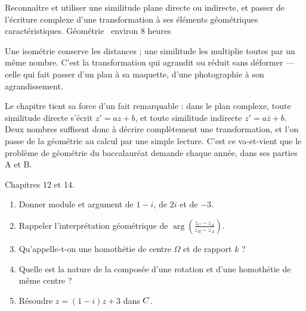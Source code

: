   {Reconnaître et utiliser une similitude plane directe ou indirecte, et
   passer de l'écriture complexe d'une transformation à ses éléments
   géométriques caractéristiques.}
  {Géométrie \textbullet\ environ 8 heures}

Une isométrie conserve les distances ; une similitude les multiplie toutes par
un même nombre. C'est la transformation qui agrandit ou réduit sans déformer
— celle qui fait passer d'un plan à sa maquette, d'une photographie à son
agrandissement.

Le chapitre tient sa force d'un fait remarquable : dans le plan complexe,
toute similitude directe s'écrit $z' = az+b$, et toute similitude indirecte
$z' = a\overline z+b$. Deux nombres suffisent donc à décrire complètement une
transformation, et l'on passe de la géométrie au calcul par une simple
lecture. C'est ce va-et-vient que le problème de géométrie du baccalauréat
demande chaque année, dans ses parties A et B.

\begin{revision}
Chapitres 12 et 14.

\begin{enumerate}[label=\textbf{\arabic*.}, leftmargin=*, itemsep=0.35em]
  \item Donner module et argument de $1-i$, de $2i$ et de $-3$.
  \item Rappeler l'interprétation géométrique de
        $\arg\!\left(\frac{z_{C}-z_{A}}{z_{B}-z_{A}}\right)$.
  \item Qu'appelle-t-on une homothétie de centre $\Omega$ et de rapport $k$ ?
  \item Quelle est la nature de la composée d'une rotation et d'une
        homothétie de même centre ?
  \item Résoudre $z = (1-i)z+3$ dans $C$.
\end{enumerate}
\end{revision}

